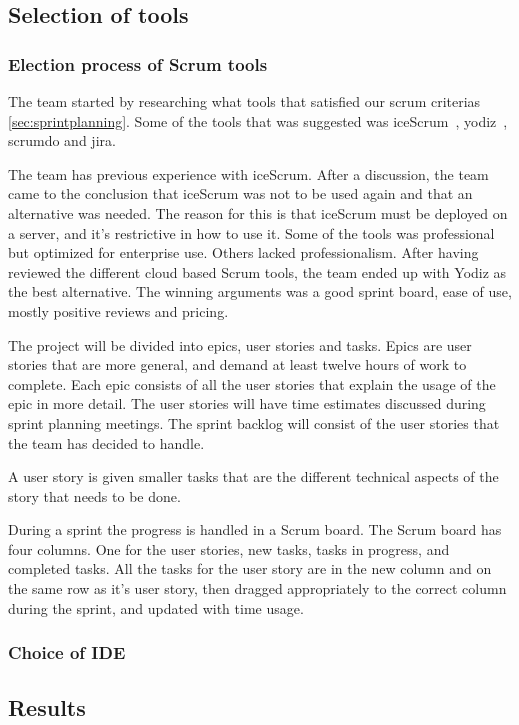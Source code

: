 \subsection{Selection of tools}
\subsubsection{Election process of Scrum tools}
\label{sec:scrumtools}
The team started by researching what tools that satisfied our scrum criterias \ref{sec:sprintplanning}. Some of the tools that was suggested was iceScrum~\cite{icescrum}, yodiz~\cite{yodiz}, scrumdo and jira.

The team has previous experience with iceScrum. After a discussion, the team came to the conclusion
that iceScrum was not to be used again and that an alternative was needed. The reason for this is that iceScrum must be deployed on a server, and it's restrictive in how to use it.
Some of the tools was professional but optimized for enterprise use. Others lacked professionalism.
After having reviewed the different cloud based Scrum tools, the team ended up with Yodiz as the best alternative. The winning arguments was a
good sprint board, ease of use, mostly positive reviews and pricing.

The project will be divided into epics, user stories and tasks. Epics are user stories that are more general,
and demand at least twelve hours of work to complete. Each epic consists
of all the user stories that explain the usage of the epic in more detail.
The user stories will have time estimates discussed during sprint planning meetings.
The sprint backlog will consist of the user stories that the team has decided to handle.

A user story is given smaller tasks that are the different technical aspects of the story that needs to be done.

During a sprint the progress is handled in a Scrum board. The Scrum board has four columns. One for the user stories, new tasks, tasks in progress, and completed tasks.
All the tasks for the user story are in the new column and on the same row as it's user story, then dragged appropriately to the correct column during the sprint, and updated with time usage.

\subsubsection{Choice of IDE}

\subsection{Results}
